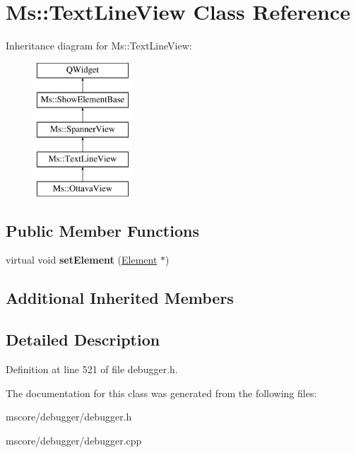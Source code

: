 \hypertarget{class_ms_1_1_text_line_view}{}\section{Ms\+:\+:Text\+Line\+View Class Reference}
\label{class_ms_1_1_text_line_view}
Inheritance diagram for Ms\+:\+:Text\+Line\+View\+:\begin{figure}[H]
\begin{center}
\leavevmode
\includegraphics[height=5.000000cm]{class_ms_1_1_text_line_view}
\end{center}
\end{figure}
\subsection*{Public Member Functions}
\begin{DoxyCompactItemize}
\item 
\mbox{\label{class_ms_1_1_text_line_view_a552e6b939b520674d1f3347bceff32f2}} 
virtual void {\bfseries set\+Element} (\hyperlink{class_ms_1_1_element}{Element} $\ast$)
\end{DoxyCompactItemize}
\subsection*{Additional Inherited Members}


\subsection{Detailed Description}


Definition at line 521 of file debugger.\+h.



The documentation for this class was generated from the following files\+:\begin{DoxyCompactItemize}
\item 
mscore/debugger/debugger.\+h\item 
mscore/debugger/debugger.\+cpp\end{DoxyCompactItemize}
